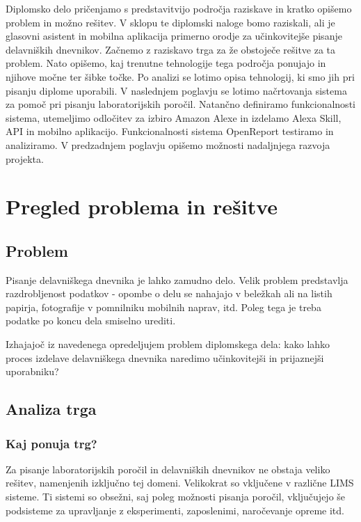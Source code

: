 \documentclass[a4paper, 12pt]{book}
\begin{document}
Diplomsko delo pričenjamo s predstavitvijo področja raziskave in kratko opišemo problem in možno rešitev. 
V sklopu te diplomski naloge bomo raziskali, ali je glasovni asistent in mobilna aplikacija primerno orodje za učinkovitejše pisanje delavniških dnevnikov.
Začnemo z raziskavo trga za že obstoječe rešitve za ta problem.
Nato opišemo, kaj trenutne tehnologije tega področja ponujajo in njihove močne ter šibke točke.
Po analizi se lotimo opisa tehnologij, ki smo jih pri pisanju diplome uporabili.
V naslednjem poglavju se lotimo načrtovanja sistema za pomoč pri pisanju laboratorijskih poročil.
Natančno definiramo funkcionalnosti sistema, utemeljimo odločitev za izbiro Amazon Alexe in izdelamo Alexa Skill, API in mobilno aplikacijo.
Funkcionalnosti sistema OpenReport testiramo in analiziramo.
V predzadnjem poglavju opišemo možnosti nadaljnjega razvoja projekta.

\chapter{Pregled problema in rešitve}

\section{Problem}

Pisanje delavniškega dnevnika je lahko zamudno delo.
Velik problem predstavlja razdrobljenost podatkov - opombe o delu se nahajajo v beležkah ali na listih papirja, fotografije v pomnilniku mobilnih naprav, itd.
Poleg tega je treba podatke po koncu dela smiselno urediti.

Izhajajoč iz navedenega opredeljujem problem diplomskega dela: kako lahko proces izdelave delavniškega dnevnika naredimo učinkovitejši in prijaznejši uporabniku?

\section{Analiza trga}

\subsection{Kaj ponuja trg?}
Za pisanje laboratorijskih poročil in delavniških dnevnikov ne obstaja veliko rešitev, namenjenih izključno tej domeni.
Velikokrat so vključene v različne LIMS sisteme.
Ti sistemi so obsežni, saj poleg možnosti pisanja poročil, vključujejo še podsisteme za upravljanje z eksperimenti, zaposlenimi, naročevanje opreme itd.
\end{document}

